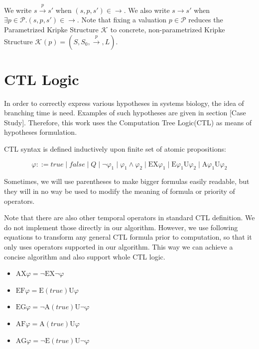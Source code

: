 \documentclass[12pt,oneside,draft]{fithesis2}
\newcommand{\ks}[1][]{\ensuremath{\mathcal{K}_{#1}}}
\newcommand{\trans}[1]{\stackrel{#1}{\rightarrow}}
\newcommand{\params}{\mathcal{P}}
\newcommand{\eu}[2]{\ensuremath{\mbox{E} #1 \mbox{U} #2 }}
\newcommand{\au}[2]{\ensuremath{\mbox{A} #1 \mbox{U} #2 }}
\newcommand{\ex}[1]{\ensuremath{\mbox{EX} #1}}
\newcommand{\ax}[1]{\ensuremath{\mbox{AX} #1}}
\newcommand{\ef}[1]{\ensuremath{\mbox{EF} #1}}
\newcommand{\af}[1]{\ensuremath{\mbox{AF} #1}}
\newcommand{\eg}[1]{\ensuremath{\mbox{EG} #1}}
\newcommand{\ag}[1]{\ensuremath{\mbox{AG} #1}}
\begin{document}
			We write $ s \trans{p} s' $ when $ (s, p, s') \in \trans{} $. We also write $ s \trans{} s'$ when $\exists p \in \params. (s, p, s') \in \trans{} $. Note that fixing a valuation $p \in \params$ reduces the Parametrized Kripke Structure $\ks$ to concrete, non-parametrized Kripke Structure $\ks(p) = (S, S_0, \trans{p}, L)$.
						
		\section{CTL Logic}
		
			In order to correctly express various hypotheses in systems biology, the idea of branching time is need. Examples of such hypotheses are given in section [Case Study]. Therefore, this work uses the Computation Tree Logic(CTL) as means of hypotheses formulation. 

			CTL syntax is defined inductively upon finite set of atomic propositions:
			
			\begin{equation}
				\varphi ::= 
					true \mid
					false \mid
					Q \mid 
					\neg \varphi_1 \mid 
					\varphi_1 \wedge \varphi_2 \mid
					\ex{\varphi_1} \mid
					\eu{\varphi_1}{\varphi_2} \mid
					\au{\varphi_1}{\varphi_2}			
			\end{equation}
			
			Sometimes, we will use parentheses to make bigger formulas easily readable, but they will in no way be used to modify the meaning of formula or priority of operators.
			
			Note	 that there are also other temporal operators in standard CTL definition. We do not implement those directly in our algorithm. However, we use following equations to transform any general CTL formula prior to computation, so that it only uses operators supported in our algorithm. This way we can achieve a concise algorithm and also support whole CTL logic.
			
			\begin{itemize}
				\item $ \ax{\varphi} = \neg \ex{ \neg \varphi } $
				\item $ \ef{\varphi} = \eu{(true)}{\varphi} $
				\item $ \eg{\varphi} = \neg \au{(true)}{\neg \varphi} $
				\item $ \af{\varphi} = \au{(true)}{\varphi} $
				\item $ \ag{\varphi} = \neg \eu{(true)}{\neg \varphi}$
			\end{itemize}
			
\end{document}
